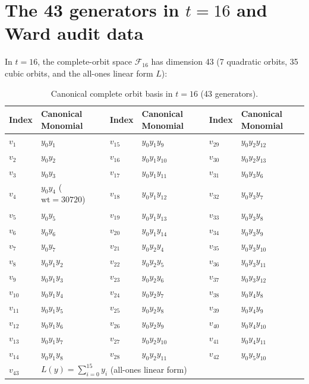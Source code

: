 \documentclass[11pt,a4paper]{article}
\theoremstyle{definition}
\newcommand{\wt}{\mathrm{wt}}
\begin{document}
\section{The 43 generators in \texorpdfstring{$t=16$}{t=16} and Ward audit data}

In $t = 16$, the complete-orbit space $\mathcal{F}_{16}$ has dimension 43 (7 quadratic orbits, 35 cubic orbits, and the all-ones linear form $L$):

\begin{table}[htbp]
\centering
\small
\caption{Canonical complete orbit basis in $t = 16$ (43 generators).}
\begin{tabular}{ll|ll|ll}
\toprule
Index & Canonical Monomial & Index & Canonical Monomial & Index & Canonical Monomial \\
\midrule
$v_1$ & $y_0 y_1$ & $v_{15}$ & $y_0 y_1 y_9$ & $v_{29}$ & $y_0 y_2 y_{12}$ \\
$v_2$ & $y_0 y_2$ & $v_{16}$ & $y_0 y_1 y_{10}$ & $v_{30}$ & $y_0 y_2 y_{13}$ \\
$v_3$ & $y_0 y_3$ & $v_{17}$ & $y_0 y_1 y_{11}$ & $v_{31}$ & $y_0 y_3 y_6$ \\
$v_4$ & $y_0 y_4$ ($\wt=30720$) & $v_{18}$ & $y_0 y_1 y_{12}$ & $v_{32}$ & $y_0 y_3 y_7$ \\
$v_5$ & $y_0 y_5$ & $v_{19}$ & $y_0 y_1 y_{13}$ & $v_{33}$ & $y_0 y_3 y_8$ \\
$v_6$ & $y_0 y_6$ & $v_{20}$ & $y_0 y_1 y_{14}$ & $v_{34}$ & $y_0 y_3 y_9$ \\
$v_7$ & $y_0 y_7$ & $v_{21}$ & $y_0 y_2 y_4$ & $v_{35}$ & $y_0 y_3 y_{10}$ \\
$v_8$ & $y_0 y_1 y_2$ & $v_{22}$ & $y_0 y_2 y_5$ & $v_{36}$ & $y_0 y_3 y_{11}$ \\
$v_9$ & $y_0 y_1 y_3$ & $v_{23}$ & $y_0 y_2 y_6$ & $v_{37}$ & $y_0 y_3 y_{12}$ \\
$v_{10}$ & $y_0 y_1 y_4$ & $v_{24}$ & $y_0 y_2 y_7$ & $v_{38}$ & $y_0 y_4 y_8$ \\
$v_{11}$ & $y_0 y_1 y_5$ & $v_{25}$ & $y_0 y_2 y_8$ & $v_{39}$ & $y_0 y_4 y_9$ \\
$v_{12}$ & $y_0 y_1 y_6$ & $v_{26}$ & $y_0 y_2 y_9$ & $v_{40}$ & $y_0 y_4 y_{10}$ \\
$v_{13}$ & $y_0 y_1 y_7$ & $v_{27}$ & $y_0 y_2 y_{10}$ & $v_{41}$ & $y_0 y_4 y_{11}$ \\
$v_{14}$ & $y_0 y_1 y_8$ & $v_{28}$ & $y_0 y_2 y_{11}$ & $v_{42}$ & $y_0 y_5 y_{10}$ \\
\midrule
$v_{43}$ & \multicolumn{5}{l}{$L(y) = \sum_{i=0}^{15} y_i$ (all-ones linear form)} \\
\bottomrule
\end{tabular}
\end{table}
\end{document}
